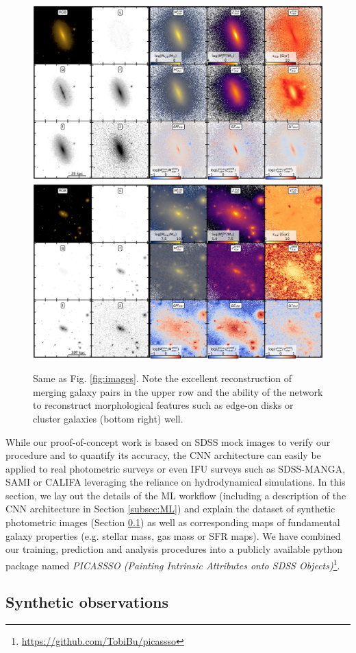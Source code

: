 \documentclass[useAMS,usenatbib]{mnras}
\begin{document}
\begin{figure}
\begin{center}
\includegraphics[width=.49\textwidth]{./plots/190_masked.pdf}
\includegraphics[width=.49\textwidth]{./plots/3_masked.pdf}
\end{center}
\vspace{-.35cm}
\caption{Same as Fig. \ref{fig:images}. Note the excellent reconstruction of merging galaxy pairs in the upper row and the ability of the network to reconstruct morphological features such as edge-on disks or cluster galaxies (bottom right) well.   
}
\label{fig:images2}
\end{figure}

While our proof-of-concept work is based on SDSS mock images to verify our procedure and to quantify its accuracy, the CNN architecture can easily be applied to real photometric surveys or even IFU surveys such as SDSS-MANGA, SAMI or CALIFA leveraging the reliance on hydrodynamical simulations. In this section, we lay out the details of the ML workflow (including a description of the CNN architecture in Section \ref{subsec:ML}) and explain the dataset of synthetic photometric images (Section \ref{subsec:sdss}) as well as corresponding maps of fundamental galaxy properties (e.g. stellar mass, gas mass or SFR maps).
We have combined our training, prediction and analysis procedures into a publicly available python package named \textit{PICASSSO (Painting Intrinsic Attributes onto SDSS Objects)}\footnote{\url{https://github.com/TobiBu/picassso}}. 

\subsection{Synthetic observations} \label{subsec:sdss}
\end{document}
